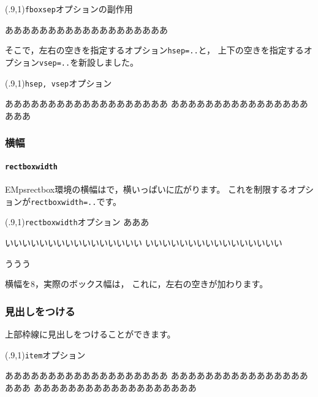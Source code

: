 \documentclass[a4j]{jarticle}
\begin{document}
\begin{showEx}(.9,1){\texttt{fboxsep}オプションの副作用}
\begin{EMpsrectbox}[fboxsep=1\zw]
あああああああああああああああああああ

\end{EMpsrectbox}
\end{showEx}

そこで，左右の空きを指定するオプション\verb+hsep=..+と，
上下の空きを指定するオプション\verb+vsep=..+を新設しました。

\begin{showEx}(.9,1){\texttt{hsep, vsep}オプション}
\begin{EMpsrectbox}[hsep=3\zw,vsep=1\zw]
あああああああああああああああああああ
あああああああああああああああああああ

\end{EMpsrectbox}
\end{showEx}

\subsubsection{横幅}
\paragraph{\texttt{rectboxwidth}}
\textsf{EMpsrectbox}環境の横幅はで，横いっぱいに広がります。
これを制限するオプションが\verb+rectboxwidth=..+です。

\begin{showEx}(.9,1){\texttt{rectboxwidth}オプション}
あああ
\begin{EMpsrectbox}[rectboxwidth=8\zw]
いいいいいいいいいいいいいいいい
いいいいいいいいいいいいいいいい
\end{EMpsrectbox}
ううう
\end{showEx}

横幅を8，実際のボックス幅は，
これに，左右の空きが加わります。

\subsubsection{見出しをつける}
上部枠線に見出しをつけることができます。

\begin{showEx}(.9,1){\texttt{item}オプション}
\begin{EMpsrectbox}[item={~見出し~}]
あああああああああああああああああああ
あああああああああああああああああああ
あああああああああああああああああああ
\end{EMpsrectbox}
\end{showEx}
\end{document}
